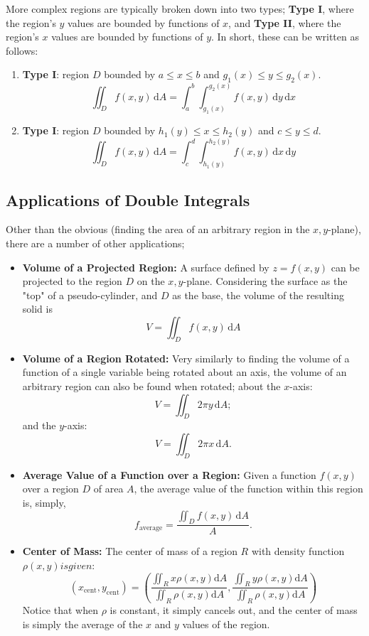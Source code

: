 \documentclass[12pt]{article}
\begin{document}
{More complex regions are typically broken down into two types; \textbf{Type I}, where the region's $y$ values are bounded by functions of $x$, and \textbf{Type II}, where the region's $x$ values are bounded by functions of $y$. In short, these can be written as follows:
\begin{enumerate}
    \item \textbf{Type I}: region $D$ bounded by $a \leq x \leq b$ and $g_1(x) \leq y \leq g_2(x)$. \[\iint_D f(x,y) \,\text{d}A = \int_a^b \int_{g_1(x)}^{g_2(x)} f(x,y) \,\text{d}y \,\text{d}x\]
    \item \textbf{Type I}: region $D$ bounded by $h_1(y) \leq x \leq h_2(y)$ and $c \leq y \leq d$. \[\iint_D f(x,y) \,\text{d}A = \int_c^d \int_{h_1(y)}^{h_2(y)} f(x,y) \, \text{d}x \, \text{d}y\]
\end{enumerate}

\subsection{Applications of Double Integrals}

Other than the obvious (finding the area of an arbitrary region in the $x,y$-plane), there are a number of other applications;

\begin{itemize}
    \item \textbf{Volume of a Projected Region:} A surface defined by $z = f(x,y)$ can be projected to the region $D$ on the $x,y$-plane. Considering the surface as the "top" of a pseudo-cylinder, and $D$ as the base, the volume of the resulting solid is \[V = \iint_D f(x,y) \,\text{d}A\]
    \item \textbf{Volume of a Region Rotated:} Very similarly to finding the volume of a function of a single variable being rotated about an axis, the volume of an arbitrary region can also be found when rotated; about the $x$-axis: \[V = \iint_D 2\pi y \, \text{d}A;\] and the $y$-axis: \[V = \iint_D 2\pi x\, \text{d}A. \]
    \item \textbf{Average Value of a Function over a Region:} Given a function $f(x,y)$ over a region $D$ of area $A$, the average value of the function within this region is, simply, \[f_{\text{average}} = \frac{\iint_D f(x,y) \, \text{d}A}{A}.\]
    \item \textbf{Center of Mass:} The center of mass of a region $R$ with density function $\rho(x,y) is given: $\[(x_{\text{cent}}, y_{\text{cent}}) = \left(\frac{\iint_R x\rho(x,y) \text{d}A}{\iint_R \rho(x,y) \text{d}A}, \frac{\iint_R y\rho(x,y) \text{d}A}{\iint_R \rho(x,y) \text{d}A}\right)\] Notice that when $\rho$ is constant, it simply cancels out, and the center of mass is simply the average of the $x$ and $y$ values of the region.
\end{itemize}

}
\end{document}
